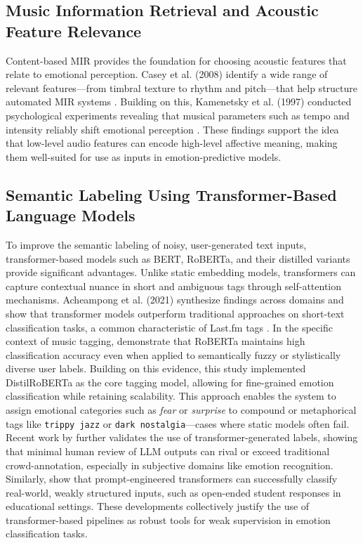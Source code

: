 \documentclass{article}
\begin{document}
\subsection{Music Information Retrieval and Acoustic Feature Relevance}

Content-based MIR provides the foundation for choosing acoustic features that relate to emotional perception. Casey et al. (2008) identify a wide range of relevant features—from timbral texture to rhythm and pitch—that help structure automated MIR systems \parencite{Casey2008}. Building on this, Kamenetsky et al. (1997) conducted psychological experiments revealing that musical parameters such as tempo and intensity reliably shift emotional perception \parencite{Kamenetsky1997}. These findings support the idea that low-level audio features can encode high-level affective meaning, making them well-suited for use as inputs in emotion-predictive models.

\subsection{Semantic Labeling Using Transformer-Based Language Models}

To improve the semantic labeling of noisy, user-generated text inputs, transformer-based models such as BERT, RoBERTa, and their distilled variants provide significant advantages. Unlike static embedding models, transformers can capture contextual nuance in short and ambiguous tags through self-attention mechanisms. Acheampong et al. (2021) synthesize findings across domains and show that transformer models outperform traditional approaches on short-text classification tasks, a common characteristic of Last.fm tags \parencite{Acheampong2021}. In the specific context of music tagging, \textcite{Olha2023} demonstrate that RoBERTa maintains high classification accuracy even when applied to semantically fuzzy or stylistically diverse user labels. Building on this evidence, this study implemented DistilRoBERTa as the core tagging model, allowing for fine-grained emotion classification while retaining scalability. This approach enables the system to assign emotional categories such as \textit{fear} or \textit{surprise} to compound or metaphorical tags like \texttt{trippy jazz} or \texttt{dark nostalgia}—cases where static models often fail. Recent work by \textcite{Artemova2025} further validates the use of transformer-generated labels, showing that minimal human review of LLM outputs can rival or exceed traditional crowd-annotation, especially in subjective domains like emotion recognition. Similarly, \textcite{Kim2024} show that prompt-engineered transformers can successfully classify real-world, weakly structured inputs, such as open-ended student responses in educational settings. These developments collectively justify the use of transformer-based pipelines as robust tools for weak supervision in emotion classification tasks.
\end{document}

